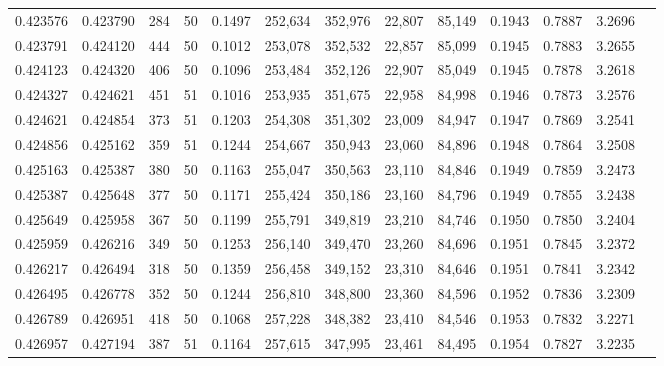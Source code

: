 \begin{tabular}{rrrrrrrrrrrrr}
0.423576 & 0.423790 &   284 &  50 &                                     0.1497 & 252,634 & 352,976 &  22,807 &  85,149 & 0.1943 & 0.7887 & 3.2696 \\
0.423791 & 0.424120 &   444 &  50 &                                     0.1012 & 253,078 & 352,532 &  22,857 &  85,099 & 0.1945 & 0.7883 & 3.2655 \\
0.424123 & 0.424320 &   406 &  50 &                                     0.1096 & 253,484 & 352,126 &  22,907 &  85,049 & 0.1945 & 0.7878 & 3.2618 \\
0.424327 & 0.424621 &   451 &  51 &                                     0.1016 & 253,935 & 351,675 &  22,958 &  84,998 & 0.1946 & 0.7873 & 3.2576 \\
0.424621 & 0.424854 &   373 &  51 &                                     0.1203 & 254,308 & 351,302 &  23,009 &  84,947 & 0.1947 & 0.7869 & 3.2541 \\
0.424856 & 0.425162 &   359 &  51 &                                     0.1244 & 254,667 & 350,943 &  23,060 &  84,896 & 0.1948 & 0.7864 & 3.2508 \\
0.425163 & 0.425387 &   380 &  50 &                                     0.1163 & 255,047 & 350,563 &  23,110 &  84,846 & 0.1949 & 0.7859 & 3.2473 \\
0.425387 & 0.425648 &   377 &  50 &                                     0.1171 & 255,424 & 350,186 &  23,160 &  84,796 & 0.1949 & 0.7855 & 3.2438 \\
0.425649 & 0.425958 &   367 &  50 &                                     0.1199 & 255,791 & 349,819 &  23,210 &  84,746 & 0.1950 & 0.7850 & 3.2404 \\
0.425959 & 0.426216 &   349 &  50 &                                     0.1253 & 256,140 & 349,470 &  23,260 &  84,696 & 0.1951 & 0.7845 & 3.2372 \\
0.426217 & 0.426494 &   318 &  50 &                                     0.1359 & 256,458 & 349,152 &  23,310 &  84,646 & 0.1951 & 0.7841 & 3.2342 \\
0.426495 & 0.426778 &   352 &  50 &                                     0.1244 & 256,810 & 348,800 &  23,360 &  84,596 & 0.1952 & 0.7836 & 3.2309 \\
0.426789 & 0.426951 &   418 &  50 &                                     0.1068 & 257,228 & 348,382 &  23,410 &  84,546 & 0.1953 & 0.7832 & 3.2271 \\
0.426957 & 0.427194 &   387 &  51 &                                     0.1164 & 257,615 & 347,995 &  23,461 &  84,495 & 0.1954 & 0.7827 & 3.2235 \\

\end{tabular}
